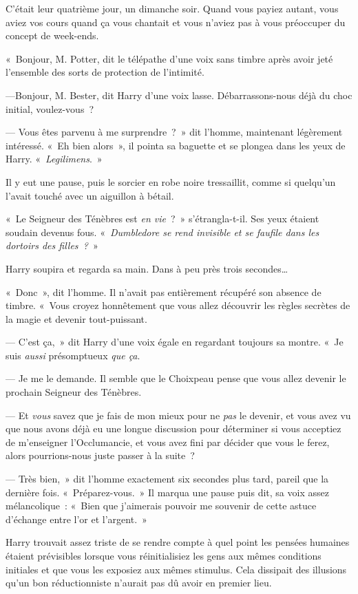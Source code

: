 C'était leur quatrième jour, un dimanche soir. Quand vous payiez autant, vous aviez vos cours quand ça vous chantait et vous n'aviez pas à vous préoccuper du concept de week-ends.

«~Bonjour, M. Potter, dit le télépathe d'une voix sans timbre après avoir jeté l'ensemble des sorts de protection de l'intimité.

---Bonjour, M. Bester, dit Harry d'une voix lasse. Débarrassons-nous déjà du choc initial, voulez-vous~?

--- Vous êtes parvenu à me surprendre~?~» dit l'homme, maintenant légèrement intéressé. «~Eh bien alors~», il pointa sa baguette et se plongea dans les yeux de Harry. «~\emph{Legilimens}.~»

Il y eut une pause, puis le sorcier en robe noire tressaillit, comme si quelqu'un l'avait touché avec un aiguillon à bétail.

«~Le Seigneur des Ténèbres est \emph{en vie}~?~» s'étrangla-t-il. Ses yeux étaient soudain devenus fous. «~\emph{Dumbledore se rend invisible et se faufile dans les dortoirs des filles~?}~»

Harry soupira et regarda sa main. Dans à peu près trois secondes…

«~Donc~», dit l'homme. Il n'avait pas entièrement récupéré son absence de timbre. «~Vous croyez honnêtement que vous allez découvrir les règles secrètes de la magie et devenir tout-puissant.

--- C'est ça,~» dit Harry d'une voix égale en regardant toujours sa montre. «~Je suis \emph{aussi} présomptueux \emph{que ça}.

--- Je me le demande. Il semble que le Choixpeau pense que vous allez devenir le prochain Seigneur des Ténèbres.

--- Et \emph{vous} savez que je fais de mon mieux pour ne \emph{pas} le devenir, et vous avez vu que nous avons déjà eu une longue discussion pour déterminer si vous acceptiez de m'enseigner l'Occlumancie, et vous avez fini par décider que vous le ferez, alors pourrions-nous juste passer à la suite~?

--- Très bien,~» dit l'homme exactement six secondes plus tard, pareil que la dernière fois. «~Préparez-vous.~» Il marqua une pause puis dit, sa voix assez mélancolique~: «~Bien que j'aimerais pouvoir me souvenir de cette astuce d'échange entre l'or et l'argent.~»

Harry trouvait assez triste de se rendre compte à quel point les pensées humaines étaient prévisibles lorsque vous réinitialisiez les gens aux mêmes conditions initiales et que vous les exposiez aux mêmes stimulus. Cela dissipait des illusions qu'un bon réductionniste n'aurait pas dû avoir en premier lieu.

